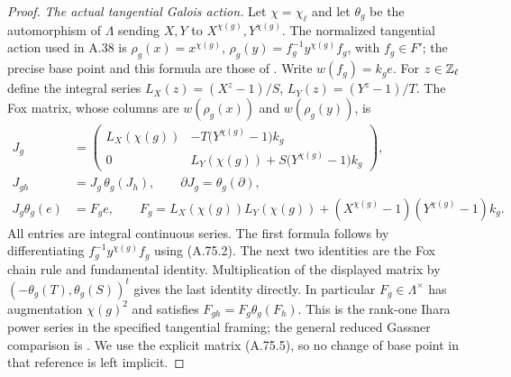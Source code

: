 \begin{proof}
\emph{The actual tangential Galois action.}
Let $\chi=\chi_\ell$ and let $\theta_g$ be the automorphism of
$\Lambda$ sending $X,Y$ to $X^{\chi(g)},Y^{\chi(g)}$.
The normalized tangential action used in A.38 is
$\rho_g(x)=x^{\chi(g)}$,
$\rho_g(y)=f_g^{-1}y^{\chi(g)}f_g$, with $f_g\in F'$;
the precise base point and this formula are those of
\cite[\S2, (2.1) and its following paragraph]
{BIR_NakamuraSchneps2000}.
Write $w(f_g)=k_g e$.
For $z\in\mathbb Z_\ell$ define the integral series
$L_X(z)=(X^z-1)/S$, $L_Y(z)=(Y^z-1)/T$.
The Fox matrix, whose columns are $w(\rho_g(x))$ and
$w(\rho_g(y))$, is
\[
 \begin{split}
 J_g&=
 \begin{pmatrix}
 L_X(\chi(g))&-T\bigl(Y^{\chi(g)}-1\bigr)k_g\\
 0&L_Y(\chi(g))+S\bigl(Y^{\chi(g)}-1\bigr)k_g
 \end{pmatrix},\\
 J_{gh}&=J_g\,\theta_g(J_h),\qquad
              \partial J_g=\theta_g(\partial),\\
 J_g\theta_g(e)&=F_g e,\qquad
 F_g=L_X(\chi(g))L_Y(\chi(g))
       +(X^{\chi(g)}-1)(Y^{\chi(g)}-1)k_g .
 \end{split}
 \tag{A.75.5}
\]
All entries are integral continuous series.
The first formula follows by differentiating
$f_g^{-1}y^{\chi(g)}f_g$ using (A.75.2).
The next two identities are the Fox chain rule and fundamental
identity.  Multiplication of the displayed matrix by
$(-\theta_g(T),\theta_g(S))^t$ gives the last identity directly.
In particular $F_g\in\Lambda^\times$ has augmentation
$\chi(g)^2$ and satisfies
$F_{gh}=F_g\theta_g(F_h)$.
This is the rank-one Ihara power series in the specified
tangential framing; the general reduced Gassner comparison is
\cite[Theorem 7.1.3]{BIR_KodaniMorishitaTerashima2017}.
We use the explicit matrix (A.75.5), so no change of base point
in that reference is left implicit.


\end{proof}
